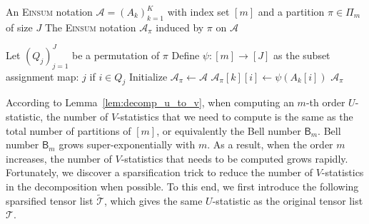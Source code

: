 \documentclass[sn-mathphys, natbib=false]{sn-jnl}
\theoremstyle{plain}
\theoremstyle{definition}
\def\tilde{\widetilde}
\def\Einsum{\textsc{Einsum}}
\newcommand{\sPi}{\pi}
\newcommand{\partition}{\Pi}
\newcommand{\partitionp}[1]{\partition_{#1}}
\newcommand{\Lin}[1]{{\color{purple}{#1}}}
\def\calA{\mathcal{A}}
\def\calT{\mathcal{T}}
\begin{document}
\begin{bibunit}[agsm]
\begin{algorithm}
    \caption{Induced \Einsum{} Notation via Partition}
    \label{alg:induced_expression}
    \begin{algorithmic}[1]
        \Require 
        \Statex An \Einsum{} notation $\calA = (A_k)_{k=1}^K$ with index set $[m]$ and a partition $\sPi \in \partitionp{m}$ of size $J$
        \Ensure The \Einsum{} notation $\calA_\sPi$ induced by $\sPi$ on $\calA$

        \Function{InducedNotation}{$\calA; \sPi$}
            \State Let $(Q_j)_{j=1}^J$ be a permutation of $\sPi$
            \State Define $\psi \colon [m] \to [J]$ as the subset assignment map:
                \State \Return $j$ if $i \in Q_j$ 
            \EndFunction
            \State Initialize $\calA_\sPi \gets \calA$
                    \State $\calA_\sPi[k][i] \gets \psi(A_k[i])$
                \EndFor
            \EndFor
            \State \Return $\calA_\sPi$
        \EndFunction
    \end{algorithmic}
\end{algorithm}

According to Lemma~\ref{lem:decomp_u_to_v}, when computing an $m$-th order $U$-statistic, the number of $V$-statistics that we need to compute is the same as the total number of partitions of $[m]$, or equivalently the Bell number $\mathsf{B}_m$. Bell number $\mathsf{B}_m$ grows super-exponentially with $m$. %
As a result, when the order $m$ increases, the number of $V$-statistics that needs to be computed grows rapidly. Fortunately, we discover a sparsification trick to reduce the number of $V$-statistics in the decomposition when possible. To this end, we first introduce the following sparsified tensor list $\tilde{\calT}$, which gives the same $U$-statistic as the original tensor list $\calT$.


\end{bibunit}
\end{document}
